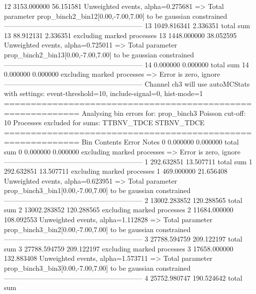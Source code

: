 12         3153.000000     56.151581       Unweighted events, alpha=0.275681
  => Total parameter prop_binch2_bin12[0.00,-7.00,7.00] to be gaussian constrained
------------------------------------------------------------
13         1049.816341     2.336351        total sum                     
13         88.912131       2.336351        excluding marked processes    
13         1448.000000     38.052595       Unweighted events, alpha=0.725011
  => Total parameter prop_binch2_bin13[0.00,-7.00,7.00] to be gaussian constrained
------------------------------------------------------------
14         0.000000        0.000000        total sum                     
14         0.000000        0.000000        excluding marked processes    
  => Error is zero, ignore      
------------------------------------------------------------
Channel ch3 will use autoMCStats with settings: event-threshold=10, include-signal=0, hist-mode=1
============================================================
Analysing bin errors for: prop_binch3
Poisson cut-off: 10
Processes excluded for sums: TTBNV_TDCE STBNV_TDCE
============================================================
Bin        Contents        Error           Notes                         
0          0.000000        0.000000        total sum                     
0          0.000000        0.000000        excluding marked processes    
  => Error is zero, ignore      
------------------------------------------------------------
1          292.632851      13.507711       total sum                     
1          292.632851      13.507711       excluding marked processes    
1          469.000000      21.656408       Unweighted events, alpha=0.623951
  => Total parameter prop_binch3_bin1[0.00,-7.00,7.00] to be gaussian constrained
------------------------------------------------------------
2          13002.283852    120.288565      total sum                     
2          13002.283852    120.288565      excluding marked processes    
2          11684.000000    108.092553      Unweighted events, alpha=1.112828
  => Total parameter prop_binch3_bin2[0.00,-7.00,7.00] to be gaussian constrained
------------------------------------------------------------
3          27788.594759    209.122197      total sum                     
3          27788.594759    209.122197      excluding marked processes    
3          17658.000000    132.883408      Unweighted events, alpha=1.573711
  => Total parameter prop_binch3_bin3[0.00,-7.00,7.00] to be gaussian constrained
------------------------------------------------------------
4          25752.980747    190.524642      total sum                     
